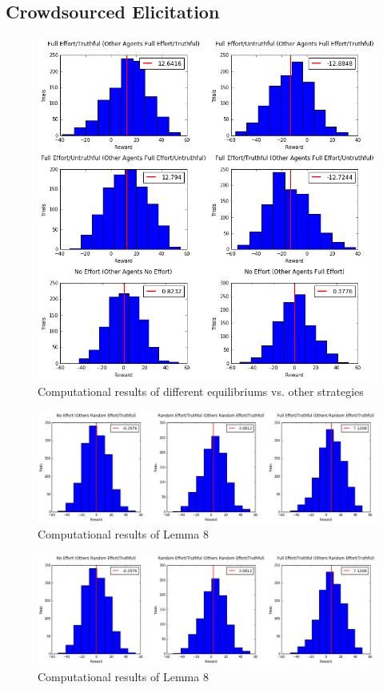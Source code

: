 \documentclass{scrartcl}
\begin{document}
\subsection{Crowdsourced Elicitation}
\begin{figure}[H]
	\caption{Computational results of different equilibriums vs. other strategies}
	\centering
	\includegraphics[width=1.0\textwidth]{cs_equilibriums}
\end{figure}
\begin{figure}[H]
	\caption{Computational results of Lemma 8}
	\centering
	\includegraphics[width=1.0\textwidth]{cs_lemma8}
\end{figure}

\begin{figure}[H]
	\caption{Computational results of Lemma 8}
	\centering
	\includegraphics[width=1.0\textwidth]{cs_lemma8}
\end{figure}
\end{document}
